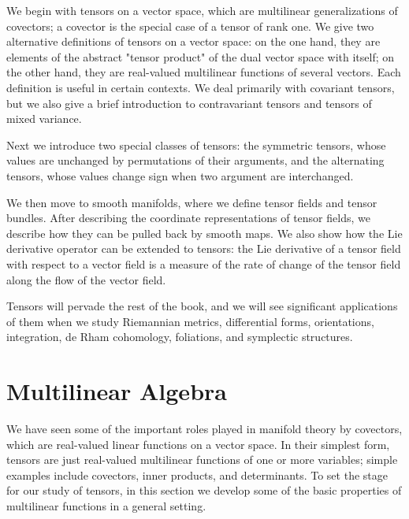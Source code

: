 \documentclass[10pt, letterpaper]{article}
\begin{document}
We begin with tensors on a vector space, which are multilinear generalizations of covectors; a covector is the special case of a tensor of rank one. We give two alternative definitions of tensors on a vector space: on the one hand, they are elements of the abstract "tensor product" of the dual vector space with itself; on the other hand, they are real-valued multilinear functions of several vectors. Each definition is useful in certain contexts. We deal primarily with covariant tensors, but we also give a brief introduction to contravariant tensors and tensors of mixed variance.

Next we introduce two special classes of tensors: the symmetric tensors, whose values are unchanged by permutations of their arguments, and the alternating tensors, whose values change sign when two argument are interchanged.

We then move to smooth manifolds, where we define tensor fields and tensor bundles. After describing the coordinate representations of tensor fields, we describe how they can be pulled back by smooth maps. We also show how the Lie derivative operator can be extended to tensors: the Lie derivative of a tensor field with respect to a vector field is a measure of the rate of change of the tensor field along the flow of the vector field.

Tensors will pervade the rest of the book, and we will see significant applications of them when we study Riemannian metrics, differential forms, orientations, integration, de Rham cohomology, foliations, and symplectic structures.

\section*{Multilinear Algebra}
We have seen some of the important roles played in manifold theory by covectors, which are real-valued linear functions on a vector space. In their simplest form, tensors are just real-valued multilinear functions of one or more variables; simple examples include covectors, inner products, and determinants. To set the stage for our study of tensors, in this section we develop some of the basic properties of multilinear functions in a general setting.
\end{document}
